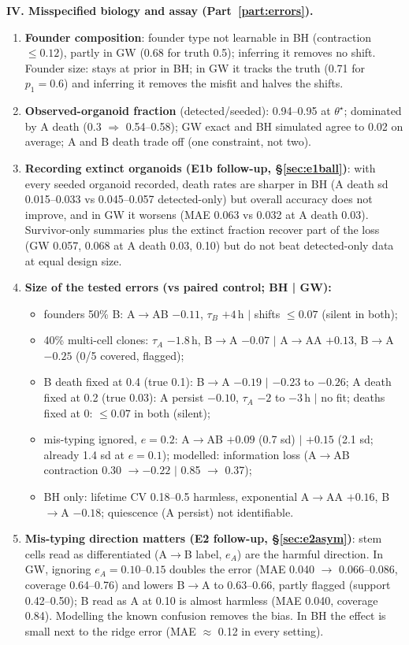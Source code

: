 \documentclass[10pt,a4paper]{article}
\newcommand{\tA}{$\tau_A$}
\newcommand{\tB}{$\tau_B$}
\begin{document}
\textbf{IV. Misspecified biology and assay (Part~\ref{part:errors}).}
\begin{enumerate}[resume,leftmargin=1.4em]
\item \textbf{Founder composition}: founder type not learnable in BH (contraction $\le 0.12$), partly in GW (0.68 for truth 0.5); inferring it removes no shift. Founder size: stays at prior in BH; in GW it tracks the truth (0.71 for $p_1=0.6$) and inferring it removes the misfit and halves the shifts.
\item \textbf{Observed-organoid fraction} (detected/seeded): 0.94--0.95 at $\theta^\star$; dominated by A death (0.3 $\Rightarrow$ 0.54--0.58); GW exact and BH simulated agree to 0.02 on average; A and B death trade off (one constraint, not two).
\item \textbf{Recording extinct organoids (E1b follow-up, \S\ref{sec:e1ball})}: with every seeded organoid recorded, death rates are sharper in BH (A death sd 0.015--0.033 vs 0.045--0.057 detected-only) but overall accuracy does not improve, and in GW it worsens (MAE 0.063 vs 0.032 at A death 0.03). Survivor-only summaries plus the extinct fraction recover part of the loss (GW 0.057, 0.068 at A death 0.03, 0.10) but do not beat detected-only data at equal design size.
\item \textbf{Size of the tested errors (vs paired control; BH | GW):}
  \begin{itemize}
  \item founders 50\% B: A$\to$AB $-0.11$, \tB{} $+4$\,h $|$ shifts $\le 0.07$ (silent in both);
  \item 40\% multi-cell clones: \tA{} $-1.8$\,h, B$\to$A $-0.07$ $|$ A$\to$AA $+0.13$, B$\to$A $-0.25$ (0/5 covered, flagged);
  \item B death fixed at 0.4 (true 0.1): B$\to$A $-0.19$ $|$ $-0.23$ to $-0.26$; A death fixed at 0.2 (true 0.03): A persist $-0.10$, \tA{} $-2$ to $-3$\,h $|$ no fit; deaths fixed at 0: $\le 0.07$ in both (silent);
  \item mis-typing ignored, $e=0.2$: A$\to$AB $+0.09$ (0.7 sd) $|$ $+0.15$ (2.1 sd; already 1.4 sd at $e=0.1$); modelled: information loss (A$\to$AB contraction 0.30 $\to -0.22$ $|$ 0.85 $\to$ 0.37);
  \item BH only: lifetime CV 0.18--0.5 harmless, exponential A$\to$AA $+0.16$, B$\to$A $-0.18$; quiescence (A persist) not identifiable.
  \end{itemize}
\item \textbf{Mis-typing direction matters (E2 follow-up, \S\ref{sec:e2asym})}: stem cells read as differentiated (A$\to$B label, $e_A$) are the harmful direction. In GW, ignoring $e_A = 0.10$--$0.15$ doubles the error (MAE 0.040 $\to$ 0.066--0.086, coverage 0.64--0.76) and lowers B$\to$A to 0.63--0.66, partly flagged (support 0.42--0.50); B read as A at 0.10 is almost harmless (MAE 0.040, coverage 0.84). Modelling the known confusion removes the bias. In BH the effect is small next to the ridge error (MAE $\approx$ 0.12 in every setting).

\end{enumerate}
\end{document}
